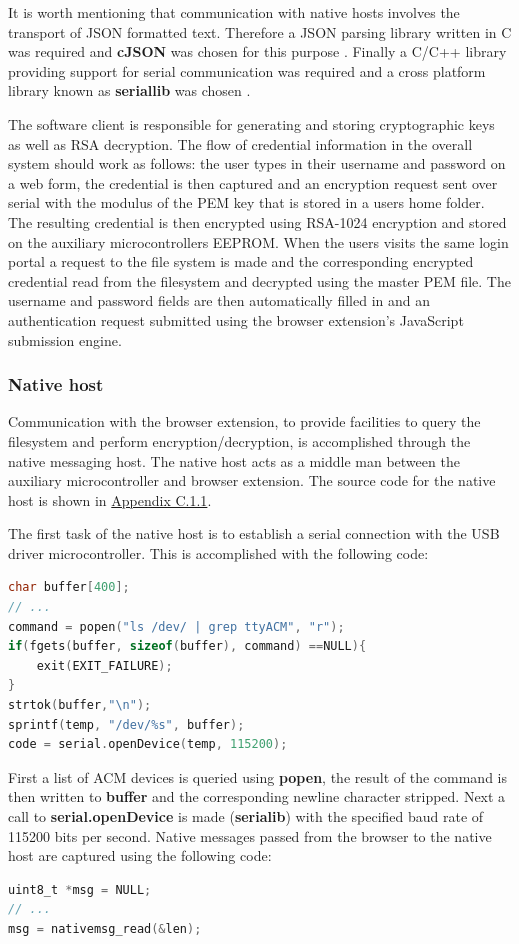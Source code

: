 It is worth mentioning that communication with native hosts involves the transport of JSON formatted text. Therefore a JSON parsing library written in C was required and \textbf{cJSON} was chosen for this purpose \cite{c_json}. Finally a C/C++ library providing support for serial communication was required and a cross platform library known as \textbf{seriallib} was chosen \cite{serial_lib}.

The software client is responsible for generating and storing cryptographic keys as well as RSA decryption. The flow of credential information in the overall system should work as follows: the user types in their username and password on a web form, the credential is then captured and an encryption request sent over serial with the modulus of the PEM key that is stored in a users home folder. The resulting credential is then encrypted using RSA-1024 encryption and stored on the auxiliary microcontrollers EEPROM. When the users visits the same login portal a request to the file system is made and the corresponding encrypted credential read from the filesystem and decrypted using the master PEM file. The username and password fields are then automatically filled in and an authentication request submitted using the browser extension's JavaScript submission engine.
\subsubsection{Native host}
Communication with the browser extension, to provide facilities to query the filesystem and perform encryption/decryption, is accomplished through the native messaging host. The native host acts as a middle man between the auxiliary microcontroller and browser extension. The source code for the native host is shown in \hyperref[sec:mainc]{Appendix C.1.1}.

The first task of the native host is to establish a serial connection with the USB driver microcontroller. This is accomplished with the following code:
\begin{lstlisting}[language=C]
char buffer[400];
// ...
command = popen("ls /dev/ | grep ttyACM", "r");
if(fgets(buffer, sizeof(buffer), command) ==NULL){
    exit(EXIT_FAILURE);
}
strtok(buffer,"\n");
sprintf(temp, "/dev/%s", buffer);
code = serial.openDevice(temp, 115200);
\end{lstlisting}

First a list of ACM devices is queried using \textbf{popen}, the result of the command is then written to \textbf{buffer} and the corresponding newline character stripped. Next a call to \textbf{serial.openDevice} is made (\textbf{serialib}) with the specified baud rate of 115200 bits per second. Native messages passed from the browser to the native host are captured using the following code:
\begin{lstlisting}[language=C]
uint8_t *msg = NULL;
// ...
msg = nativemsg_read(&len);
\end{lstlisting}

